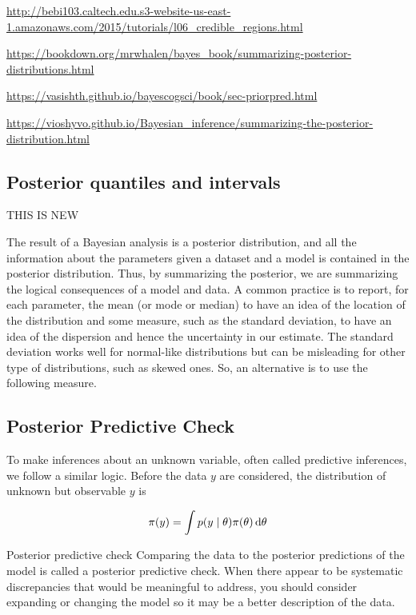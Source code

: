 \url{http://bebi103.caltech.edu.s3-website-us-east-1.amazonaws.com/2015/tutorials/l06_credible_regions.html}

\url{https://bookdown.org/mrwhalen/bayes_book/summarizing-posterior-distributions.html}

\url{https://vasishth.github.io/bayescogsci/book/sec-priorpred.html}

\url{https://vioshyvo.github.io/Bayesian_inference/summarizing-the-posterior-distribution.html}

\subsection{Posterior quantiles and intervals}




THIS IS NEW

The result of a Bayesian analysis is a posterior distribution, and all the information about the parameters given a dataset and a model is contained in the posterior distribution. Thus, by summarizing the posterior, we are summarizing the logical consequences of a model and data. A common practice is to report, for each parameter, the mean (or mode or median) to have an idea of the location of the distribution and some measure, such as the standard deviation, to have an idea of the dispersion and hence the uncertainty in our estimate. The standard deviation works well for normal-like distributions but can be misleading for other type of distributions, such as skewed ones. So, an alternative is to use the following measure.

\subsection{Posterior Predictive Check}

To make inferences about an unknown variable, often called predictive inferences, we follow a similar logic. Before the data $y$ are considered, the distribution of unknown but observable $y$ is 

\begin{equation}\label{eq:prior_predictive}
    \pi (y) = \int p \qty(y \mid \theta) \pi \qty(\theta) \dd{\theta}
\end{equation}


Posterior predictive check
Comparing the data to the posterior predictions of the model is called a posterior predictive check. When there appear to be systematic discrepancies that would be meaningful to address, you should consider expanding or changing the model so it may be a better description of the data.

